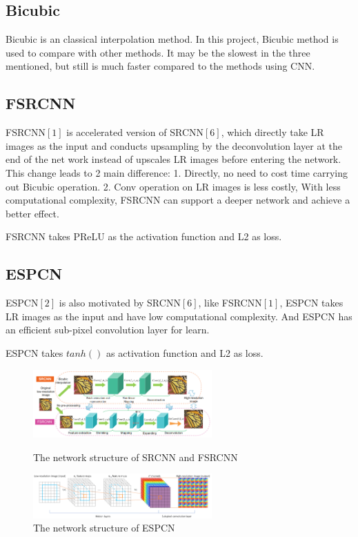 \documentclass{article}
\begin{document}
  \subsection{Bicubic}
  Bicubic is an classical interpolation method. In this project, Bicubic method is used to compare with other methods.
  It may be the slowest in the three mentioned, but still is much faster compared to the methods using CNN.
  
  \subsection{FSRCNN} 
  FSRCNN$[1]$ is accelerated version of SRCNN$[6]$, 
  which directly take LR images as the input and conducts upsampling by the deconvolution layer at the end of the net work instead of upscales LR images before entering the network. 
  This change leads to 2 main difference: 1. Directly, no need to cost time carrying out Bicubic operation. 
  2. Conv operation on LR images is less costly, With less computational complexity, 
  FSRCNN can support a deeper network and achieve a better effect.
  
  FSRCNN takes PReLU as the activation function and L2 as loss.


  \subsection{ESPCN}
  ESPCN$[2]$ is also motivated by SRCNN$[6]$, like FSRCNN$[1]$, 
  ESPCN takes LR images as the input and have low computational complexity. 
  And ESPCN has an efficient sub-pixel convolution layer for learn.
  
  ESPCN takes $tanh()$ as activation function and L2 as loss.

  \begin{figure}[H]
    \begin{minipage}[H]{0.5\linewidth}
    \centering
    \includegraphics[width=2.7in]{images/FSRCNN.png}
    \caption{The network structure of SRCNN and FSRCNN}

    \end{minipage}
    \begin{minipage}[H]{0.5\linewidth}
    \centering
    \includegraphics[width=2.7in]{images/ESPCN.png}
    \caption{The network structure of ESPCN}

    \end{minipage}
\end{figure}
\end{document}

